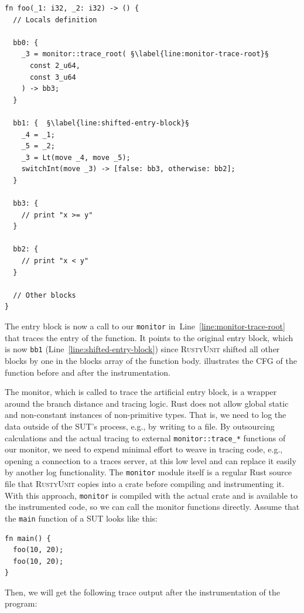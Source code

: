 \documentclass[paper=a4,%
  twoside,%
  BCOR4mm,%
  abstract=true,%
  toc=bibliography,%
  chapterprefix=true,%
  toc=bibliographynumbered,%
  open=right,%
  english,%
  pagesize=pdftex]{scrreprt}
\newcommand{\tech}{\textsc{RustyUnit}\xspace}
\newcommand{\cfg}{\ac{CFG}\xspace}
\newcommand{\sut}{\ac{SUT}\xspace}
\begin{document}
\begin{lstlisting}[style=boxed, caption={}, escapechar=§, label=lst:mir-instrument-root]
fn foo(_1: i32, _2: i32) -> () {
  // Locals definition

  bb0: {
    _3 = monitor::trace_root( §\label{line:monitor-trace-root}§
      const 2_u64, 
      const 3_u64
    ) -> bb3;
  }

  bb1: {  §\label{line:shifted-entry-block}§
    _4 = _1;
    _5 = _2;
    _3 = Lt(move _4, move _5);
    switchInt(move _3) -> [false: bb3, otherwise: bb2];
  }

  bb3: {
    // print "x >= y"
  }

  bb2: {
    // print "x < y"
  }

  // Other blocks
}
\end{lstlisting}

The entry block is now a call to our \texttt{monitor} in~Line~\ref{line:monitor-trace-root} that traces the entry of the function. It points to the original entry block, which is now \texttt{bb1} (Line~\ref{line:shifted-entry-block}) since \tech shifted all other blocks by one in the blocks array of the function body.  illustrates the \cfg of the function before and after the instrumentation.

The monitor, which is called to trace the artificial entry block, is a wrapper around the branch distance and tracing logic. Rust does not allow global static and non-constant instances of non-primitive types. That is, we need to log the data outside of the \sut's process, e.g., by writing to a file. By outsourcing calculations and the actual tracing to external \texttt{monitor::trace\string_*} functions of our monitor, we need to expend minimal effort to weave in tracing code, e.g., opening a connection to a traces server, at this low level and can replace it easily by another log functionality. The \texttt{monitor} module itself is a regular Rust source file that \tech copies into a crate before compiling and instrumenting it. With this approach, \texttt{monitor} is compiled with the actual crate and is available to the instrumented code, so we can call the monitor functions directly. Assume that the \texttt{main} function of a \sut looks like this:
\begin{lstlisting}[style=boxed, caption={}]
fn main() {
  foo(10, 20);
  foo(10, 20);
}
\end{lstlisting}

Then, we will get the following trace output after the instrumentation of the program:
\end{document}
